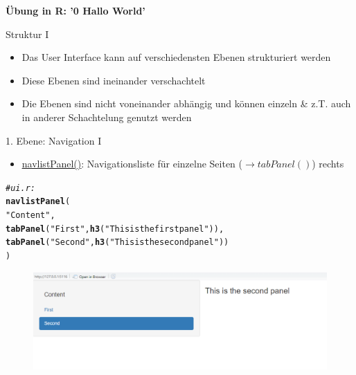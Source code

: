 \documentclass[xcolor=dvipsnames]{beamer}\usepackage[]{graphicx}\usepackage[]{color}
\makeatletter
\newcommand{\hlstr}[1]{\textcolor[rgb]{0.192,0.494,0.8}{#1}}%
\newcommand{\hlcom}[1]{\textcolor[rgb]{0.678,0.584,0.686}{\textit{#1}}}%
\newcommand{\hlstd}[1]{\textcolor[rgb]{0.345,0.345,0.345}{#1}}%
\newcommand{\hlkwd}[1]{\textcolor[rgb]{0.737,0.353,0.396}{\textbf{#1}}}%
\newenvironment{kframe}{%
 \def\at@end@of@kframe{}%
 \ifinner\ifhmode%
  \def\at@end@of@kframe{\end{minipage}}%
  \begin{minipage}{\columnwidth}%
 \fi\fi%
 \def\FrameCommand##1{\hskip\@totalleftmargin \hskip-\fboxsep
 \colorbox{shadecolor}{##1}\hskip-\fboxsep
     \hskip-\linewidth \hskip-\@totalleftmargin \hskip\columnwidth}%
 \MakeFramed {\advance\hsize-\width
   \@totalleftmargin\z@ \linewidth\hsize
   \@setminipage}}%
 {\par\unskip\endMakeFramed%
 \at@end@of@kframe}
\newenvironment{knitrout}{}{} %
\makeatother
\begin{document}
\begin{frame}{}
  \centering
  \textbf{Übung in R: '0 Hallo World'}
\end{frame}




\begin{frame}{Struktur I}
  \begin{itemize}
      \item Das User Interface kann auf verschiedensten Ebenen strukturiert werden
      \item Diese Ebenen sind ineinander verschachtelt
      \item Die Ebenen sind nicht voneinander abhängig und können einzeln \& z.T. auch in anderer Schachtelung genutzt werden
  \end{itemize}
\end{frame}



\begin{frame}[fragile]{1. Ebene: Navigation I}
  \begin{itemize}
    \item \href{https://shiny.rstudio.com/gallery/navlistpanel-example.html}{\underline{navlistPanel()}}: Navigationsliste für einzelne Seiten ($\rightarrow tabPanel()$) rechts
  \end{itemize}
\begin{knitrout}\small
{}\color{fgcolor}\begin{kframe}
\begin{alltt}
\hlcom{#ui.r:}
\hlkwd{navlistPanel}\hlstd{(}
    \hlstr{"Content"}\hlstd{,}
    \hlkwd{tabPanel}\hlstd{(}\hlstr{"First"}\hlstd{,} \hlkwd{h3}\hlstd{(}\hlstr{"This is the first panel"}\hlstd{)),}
    \hlkwd{tabPanel}\hlstd{(}\hlstr{"Second"}\hlstd{,} \hlkwd{h3}\hlstd{(}\hlstr{"This is the second panel"}\hlstd{))}
\hlstd{)}
\end{alltt}
\end{kframe}
\end{knitrout}
  \begin{figure}
  	\centering
  	\includegraphics[width=1\textwidth]{figure/navlistPanel.png}
  \end{figure}
\end{frame}
\end{document}
